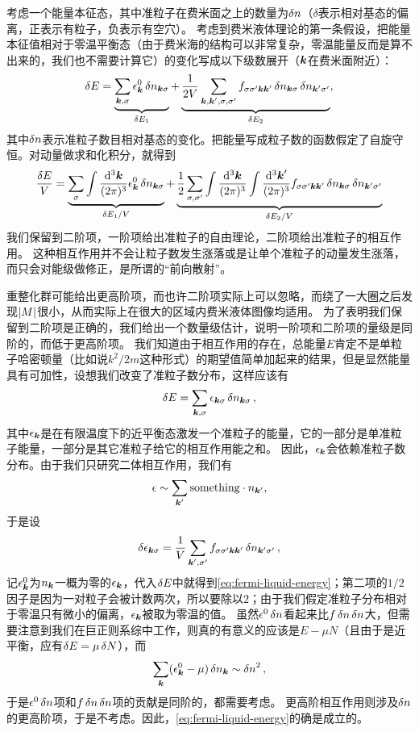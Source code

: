 考虑一个能量本征态，其中准粒子在费米面之上的数量为$\var{n}$（$\delta$表示相对基态的偏离，正表示有粒子，负表示有空穴）。
考虑到费米液体理论的第一条假设，把能量本征值相对于零温平衡态（由于费米海的结构可以非常复杂，零温能量反而是算不出来的，我们也不需要计算它）的变化写成以下级数展开（$\vb*{k}$在费米面附近）：
\begin{equation}
    \var{E} = \underbrace{\sum_{\vb*{k}, \sigma} \epsilon^0_{\vb*{k}} \var{n_{\vb*{k} \sigma}}}_{\var{E_1}} + \underbrace{\frac{1}{2V} \sum_{\vb*{k}, \vb*{k}', \sigma, \sigma'} f_{\sigma \sigma' \vb*{k} \vb*{k}'} \var{n_{\vb*{k} \sigma}} \var{n_{\vb*{k}' \sigma'}}}_{\var{E_2}},
    \label{eq:fermi-liquid-energy}
\end{equation}
其中$\var{n}$表示准粒子数目相对基态的变化。把能量写成粒子数的函数假定了自旋守恒。对动量做求和化积分，就得到
\begin{equation}
    \frac{\var{E}}{V} = \underbrace{\sum_{\sigma} \int \frac{\dd[3]{\vb*{k}}}{(2\pi)^3} \epsilon^0_{\vb*{k}} \var{n_{\vb*{k} \sigma}}}_{\var{E_1} / V} + \underbrace{\frac{1}{2} \sum_{\sigma, \sigma'} \int \frac{\dd[3]{\vb*{k}}}{(2\pi)^3} \int \frac{\dd[3]{\vb*{k}'}}{(2\pi)^3} f_{\sigma \sigma' \vb*{k} \vb*{k}'} \var{n_{\vb*{k} \sigma}} \var{n_{\vb*{k}' \sigma'}}}_{\var{E_2} / V}
\end{equation}
我们保留到二阶项，一阶项给出准粒子的自由理论，二阶项给出准粒子的相互作用。
这种相互作用并不会让粒子数发生涨落或是让单个准粒子的动量发生涨落，而只会对能级做修正，是所谓的“前向散射”。

重整化群可能给出更高阶项，而也许二阶项实际上可以忽略，而绕了一大圈之后发现$\abs{M}$很小，从而实际上在很大的区域内费米液体图像均适用。
为了表明我们保留到二阶项是正确的，我们给出一个数量级估计，说明一阶项和二阶项的量级是同阶的，而低于更高阶项。
我们知道由于相互作用的存在，总能量$E$肯定不是单粒子哈密顿量（比如说$k^2/2m$这种形式）的期望值简单加起来的结果，但是显然能量具有可加性，设想我们改变了准粒子数分布，这样应该有
\[
    \var{E} = \sum_{\vb*{k}, \sigma} \epsilon_{\vb*{k} \sigma} \var{n_{\vb*{k} \sigma}},
\]
其中$\epsilon_{\vb*{k}}$是在有限温度下的近平衡态激发一个准粒子的能量，它的一部分是单准粒子能量，一部分是其它准粒子给它的相互作用能之和。
因此，$\epsilon_{\vb*{k}}$会依赖准粒子数分布。由于我们只研究二体相互作用，我们有
\[
    \epsilon \sim \sum_{\vb*{k}'} \text{something} \cdot n_{\vb*{k}'},
\]
于是设
\[
    \var{\epsilon_{\vb*{k} \sigma}} = \frac{1}{V} \sum_{\vb*{k}', \sigma'} f_{\sigma \sigma' \vb*{k} \vb*{k}'} \var{n_{\vb*{k}' \sigma'}},
\]
记$\epsilon_{\vb*{k}}^0$为$n_{\vb*{k}}$一概为零的$\epsilon_{\vb*{k}}$，代入$\var{E}$中就得到\eqref{eq:fermi-liquid-energy}；第二项的$1/2$因子是因为一对粒子会被计数两次，所以要除以$2$；由于我们假定准粒子分布相对于零温只有微小的偏离，$\epsilon_{\vb*{k}}$被取为零温的值。
虽然$\epsilon^0 \var{n}$看起来比$f\var{n} \var{n}$大，但需要注意到我们在巨正则系综中工作，则真的有意义的应该是$E-\mu N$（且由于是近平衡，应有$\var{E} = \mu \var{N}$），而
\[
    \sum_{\vb*{k}} (\epsilon^0_{\vb*{k}} - \mu) \var{n_{\vb*{k}}} \sim \var{n}^2,
\]
于是$\epsilon^0 \var{n}$项和$f\var{n} \var{n}$项的贡献是同阶的，都需要考虑。
更高阶相互作用则涉及$\var{n}$的更高阶项，于是不考虑。因此，\eqref{eq:fermi-liquid-energy}的确是成立的。

